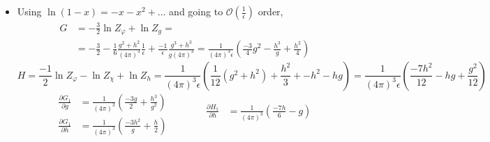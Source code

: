 \documentclass[twoside]{amsart}
\begin{document}
\begin{itemize}
\[
\begin{gathered}
  \Longrightarrow \frac{ - \epsilon}{2} \left( \begin{matrix} 1 - g \frac{ \partial_g G_1}{ \epsilon} & - g \frac{ \partial_1 G_1}{\epsilon} \\ -h \frac{ \partial_g H_1}{ \epsilon } & 1 - h \frac{ \partial_h H_1 }{\epsilon } \end{matrix} \right) \left( \begin{matrix} g \\ h \end{matrix} \right)  \simeq \\
  \simeq \boxed{ \begin{aligned}
      & \frac{ - \epsilon g}{2} + \frac{g}{2} \left( g \frac{ \partial G_1}{ \partial g} + h \frac{ \partial G_1}{ \partial h } \right) = \frac{dg}{ d\ln{ \mu }} \\ 
      & \frac{ - \epsilon h}{2} + \frac{h}{2} \left( g \frac{ \partial H_1}{ \partial g} + h \frac{  \partial H_1}{ \partial h} \right) = \frac{ dh}{ d\ln{ \mu}}
\end{aligned} }
\end{gathered}
\]
\item[(c)] Using $\ln{(1-x)} = -x - x^2 + \dots$ and going to $\mathcal{O}\left( \frac{1}{\epsilon} \right)$ order,
\[
\begin{aligned}
  G & = -\frac{3}{2} \ln{Z_{\varphi}} + \ln{ Z_g} = \\ 
  & = - \frac{3}{2} - \frac{1}{6} \frac{ g^2 + h^2 }{ (4\pi)^3 } \frac{1}{ \epsilon } + \frac{-1}{\epsilon} \frac{ g^3 + h^3 }{ g(4\pi)^3} = \frac{1}{ (4\pi)^3 \epsilon } \left( \frac{-3}{4} g^2 - \frac{h^3}{g} + \frac{h^2 }{4} \right)
\end{aligned}
\]
\[
H = \frac{-1}{2} \ln{ Z_{\varphi}} - \ln{ Z_{\chi}} + \ln{ Z_h } = \frac{1}{ (4\pi)^3 \epsilon } \left( \frac{1}{12} (g^2 + h^2 ) + \frac{h^2 }{3} + - h^2  -hg \right) = \frac{1}{ (4\pi)^3 \epsilon } \left( \frac{ - 7h^2 }{12} -hg + \frac{g^2}{12} \right)
\]
\[
\begin{aligned}
  \frac{ \partial G_1}{\partial g} & = \frac{1}{(4\pi)^3} \left( \frac{-3g}{2} + \frac{h^3}{g^2} \right) \\
  \frac{ \partial G_1}{ \partial h} & = \frac{1}{(4\pi)^3} \left( \frac{ - 3h^2 }{g}  + \frac{h}{2} \right)
\end{aligned}
\quad \quad \quad \, 
\begin{aligned}
  \frac{ \partial H_1}{ \partial h } & = \frac{1}{(4\pi)^3} \left( \frac{ - 7h }{6} -g \right) \\ 

\end{aligned}\]
\end{itemize}
\end{document}
